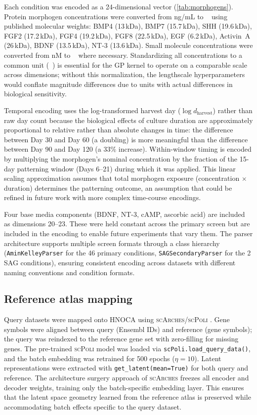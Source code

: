 \documentclass[times,twoside]{zHenriquesLab-StyleBioRxiv}
\newcommand{\hnoca}{\textsc{HNOCA}}
\newcommand{\scpoli}{\textsc{scPoli}}
\newcommand{\scarches}{\textsc{scArches}}
\begin{document}
Each condition was encoded as a 24-dimensional vector (\cref{tab:morphogens}). Protein morphogen concentrations were converted from \si{ng/mL} to \si{\micro\Molar} using published molecular weights: BMP4 (13\,kDa), BMP7 (15.7\,kDa), SHH (19.6\,kDa), FGF2 (17.2\,kDa), FGF4 (19.2\,kDa), FGF8 (22.5\,kDa), EGF (6.2\,kDa), Activin~A (26\,kDa), BDNF (13.5\,kDa), NT-3 (13.6\,kDa). Small molecule concentrations were converted from \si{nM} to \si{\micro\Molar} where necessary. Standardizing all concentrations to a common unit (\si{\micro\Molar}) is essential for the GP kernel to operate on a comparable scale across dimensions; without this normalization, the lengthscale hyperparameters would conflate magnitude differences due to units with actual differences in biological sensitivity.

Temporal encoding uses the log-transformed harvest day ($\log d_\text{harvest}$) rather than raw day count because the biological effects of culture duration are approximately proportional to relative rather than absolute changes in time: the difference between Day 30 and Day 60 (a doubling) is more meaningful than the difference between Day 90 and Day 120 (a 33\% increase). Within-window timing is encoded by multiplying the morphogen's nominal concentration by the fraction of the 15-day patterning window (Days 6--21) during which it was applied. This linear scaling approximation assumes that total morphogen exposure (concentration $\times$ duration) determines the patterning outcome, an assumption that could be refined in future work with more complex time-course encodings.

Four base media components (BDNF, NT-3, cAMP, ascorbic acid) are included as dimensions 20--23. These were held constant across the primary screen but are included in the encoding to enable future experiments that vary them. The parser architecture supports multiple screen formats through a class hierarchy (\texttt{AminKelleyParser} for the 46 primary conditions, \texttt{SAGSecondaryParser} for the 2 SAG conditions), ensuring consistent encoding across datasets with different naming conventions and condition formats.

\subsection*{Reference atlas mapping}

Query datasets were mapped onto \hnoca{} using \scarches{}/\scpoli{} \cite{Lotfollahi2022scarches, DeDonno2023scpoli}. Gene symbols were aligned between query (Ensembl IDs) and reference (gene symbols); the query was reindexed to the reference gene set with zero-filling for missing genes. The pre-trained \scpoli{} model was loaded via \texttt{scPoli.load\_query\_data()}, and the batch embedding was retrained for 500 epochs ($\eta{=}10$). Latent representations were extracted with \texttt{get\_latent(mean=True)} for both query and reference. The architecture surgery approach of \scarches{} freezes all encoder and decoder weights, training only the batch-specific embedding layer. This ensures that the latent space geometry learned from the reference atlas is preserved while accommodating batch effects specific to the query dataset.
\end{document}
